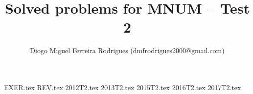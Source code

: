 \documentclass{mnumstyle}
\title{Solved problems for MNUM -- Test 2}
\author{Diogo Miguel Ferreira Rodrigues (dmfrodrigues2000@gmail.com)}
\date{}
\begin{document}
\begingroup
\maketitle
	\let\clearpage\relax
	\tableofcontents
\endgroup
{EXER.tex}
{REV.tex}
{2012T2.tex}
{2013T2.tex}
{2015T2.tex}
{2016T2.tex}
{2017T2.tex}
\end{document}

